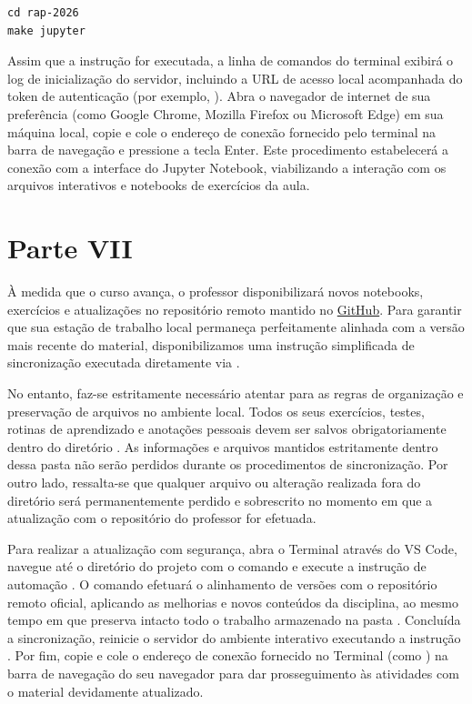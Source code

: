 \vspace{0.3cm}
\begin{lstlisting}
cd rap-2026
make jupyter
\end{lstlisting}

Assim que a instrução for executada, a linha de comandos do terminal exibirá o log de inicialização do servidor, incluindo a URL de acesso local acompanhada do token de autenticação (por exemplo, ). Abra o navegador de internet de sua preferência (como Google Chrome, Mozilla Firefox ou Microsoft Edge) em sua máquina local, copie e cole o endereço de conexão fornecido pelo terminal na barra de navegação e pressione a tecla Enter. Este procedimento estabelecerá a conexão com a interface do Jupyter Notebook, viabilizando a interação com os arquivos interativos e notebooks de exercícios da aula.



\section*{Parte VII}

À medida que o curso avança, o professor disponibilizará novos notebooks, exercícios e atualizações no repositório remoto mantido no \href{https://github.com/jodafons/rap-2026/tree/mainAula }{GitHub}. Para garantir que sua estação de trabalho local permaneça perfeitamente alinhada com a versão mais recente do material, disponibilizamos uma instrução simplificada de sincronização executada diretamente via .  

No entanto, faz-se estritamente necessário atentar para as regras de organização e preservação de arquivos no ambiente local. Todos os seus exercícios, testes, rotinas de aprendizado e anotações pessoais devem ser salvos obrigatoriamente dentro do diretório . As informações e arquivos mantidos estritamente dentro dessa pasta não serão perdidos durante os procedimentos de sincronização. Por outro lado, ressalta-se que qualquer arquivo ou alteração realizada fora do diretório  será permanentemente perdido e sobrescrito no momento em que a atualização com o repositório do professor for efetuada.

Para realizar a atualização com segurança, abra o Terminal através do VS Code, navegue até o diretório do projeto com o comando  e execute a instrução de automação . O comando  efetuará o alinhamento de versões com o repositório remoto oficial, aplicando as melhorias e novos conteúdos da disciplina, ao mesmo tempo em que preserva intacto todo o trabalho armazenado na pasta . Concluída a sincronização, reinicie o servidor do ambiente interativo executando a instrução . Por fim, copie e cole o endereço de conexão fornecido no Terminal (como ) na barra de navegação do seu navegador para dar prosseguimento às atividades com o material devidamente atualizado.